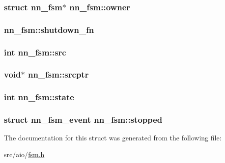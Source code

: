 \subsubsection[{owner}]{\setlength{\rightskip}{0pt plus 5cm}struct {\bf nn\+\_\+fsm}$\ast$ nn\+\_\+fsm\+::owner}\hypertarget{structnn__fsm_ae9d3ae6031c4acec6fccac4e50bf9451}{}\label{structnn__fsm_ae9d3ae6031c4acec6fccac4e50bf9451}
\subsubsection[{shutdown\+\_\+fn}]{ nn\+\_\+fsm\+::shutdown\+\_\+fn}\hypertarget{structnn__fsm_a3ee3d9dd131d8761661e2e5ba2bba998}{}\label{structnn__fsm_a3ee3d9dd131d8761661e2e5ba2bba998}
\subsubsection[{src}]{\setlength{\rightskip}{0pt plus 5cm}int nn\+\_\+fsm\+::src}\hypertarget{structnn__fsm_a71a938d92be27604a5db6228937736c8}{}\label{structnn__fsm_a71a938d92be27604a5db6228937736c8}
\subsubsection[{srcptr}]{\setlength{\rightskip}{0pt plus 5cm}void$\ast$ nn\+\_\+fsm\+::srcptr}\hypertarget{structnn__fsm_a2f1dfafc0afec5d79c7944e7b2235b1f}{}\label{structnn__fsm_a2f1dfafc0afec5d79c7944e7b2235b1f}
\subsubsection[{state}]{\setlength{\rightskip}{0pt plus 5cm}int nn\+\_\+fsm\+::state}\hypertarget{structnn__fsm_a91bac7a0fffbb658bcbfa8610716d497}{}\label{structnn__fsm_a91bac7a0fffbb658bcbfa8610716d497}
\subsubsection[{stopped}]{\setlength{\rightskip}{0pt plus 5cm}struct {\bf nn\+\_\+fsm\+\_\+event} nn\+\_\+fsm\+::stopped}\hypertarget{structnn__fsm_aba53a9882b534f46315292f7a879c018}{}\label{structnn__fsm_aba53a9882b534f46315292f7a879c018}


The documentation for this struct was generated from the following file\+:\begin{DoxyCompactItemize}
\item 
src/aio/\hyperlink{fsm_8h}{fsm.\+h}\end{DoxyCompactItemize}
